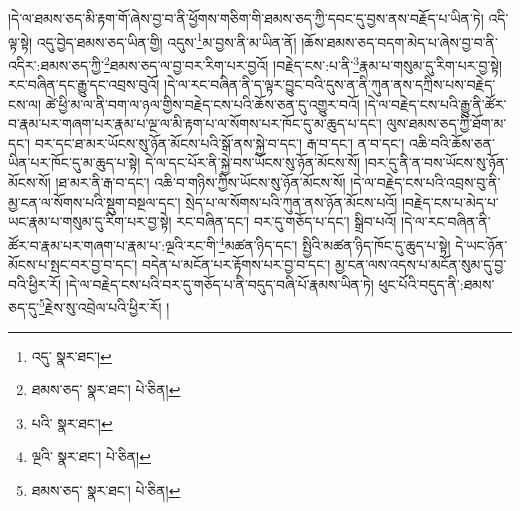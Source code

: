 །དེ་ལ་ཐམས་ཅད་མི་རྟག་གོ་ཞེས་བྱ་བ་ནི་ཕྱོགས་གཅིག་གི་ཐམས་ཅད་ཀྱི་དབང་དུ་བྱས་ནས་བརྗོད་པ་ཡིན་ཏེ། འདི་ལྟ་སྟེ། འདུ་བྱེད་ཐམས་ཅད་ཡིན་གྱི། འདུས་\footnote{འདུ་  སྣར་ཐང་། }མ་བྱས་ནི་མ་ཡིན་ནོ། །ཆོས་ཐམས་ཅད་བདག་མེད་པ་ཞེས་བྱ་བ་ནི་འདིར་:ཐམས་ཅད་ཀྱི་\footnote{ཐམས་ཅད་  སྣར་ཐང་།  པེ་ཅིན། }ཐམས་ཅད་ལ་བྱ་བར་རིག་པར་བྱའོ། །བརྗེད་ངས་:པ་ནི་\footnote{པའི་  སྣར་ཐང་། }རྣམ་པ་གསུམ་དུ་རིག་པར་བྱ་སྟེ། རང་བཞིན་དང་རྒྱུ་དང་འབྲས་བུའོ། །དེ་ལ་རང་བཞིན་ནི་ད་ལྟར་བྱུང་བའི་དུས་ན་ནི་ཀུན་ནས་དཀྲིས་པས་བརྗེད་ངས་ལ། ཚེ་ཕྱི་མ་ལ་ནི་བག་ལ་ཉལ་གྱིས་བརྗེད་ངས་པའི་ཆོས་ཅན་དུ་འགྱུར་བའོ། །དེ་ལ་བརྗེད་ངས་པའི་རྒྱུ་ནི་ཚོར་བ་རྣམ་པར་གཞག་པར་རྣམ་པ་ལྔ་ལ་མི་རྟག་པ་ལ་སོགས་པར་ཁོང་དུ་མ་ཆུད་པ་དང་། ལུས་ཐམས་ཅད་ཀྱི་ཐོག་མ་དང་། བར་དང་ཐ་མར་ཡོངས་སུ་ཉོན་མོངས་པའི་སྒོ་ནས་སྐྱེ་བ་དང་། རྒ་བ་དང་། ན་བ་དང་། འཆི་བའི་ཆོས་ཅན་ཡིན་པར་ཁོང་དུ་མ་ཆུད་པ་སྟེ། དེ་ལ་དང་པོར་ནི་སྐྱེ་བས་ཡོངས་སུ་ཉོན་མོངས་སོ། །བར་དུ་ནི་ན་བས་ཡོངས་སུ་ཉོན་མོངས་སོ། །ཐ་མར་ནི་རྒ་བ་དང་། འཆི་བ་གཉིས་ཀྱིས་ཡོངས་སུ་ཉོན་མོངས་སོ། །དེ་ལ་བརྗེད་ངས་པའི་འབྲས་བུ་ནི་མྱ་ངན་ལ་སོགས་པའི་སྡུག་བསྔལ་དང་། སྲེད་པ་ལ་སོགས་པའི་ཀུན་ནས་ཉོན་མོངས་པའོ། །བརྗེད་ངས་པ་མེད་པ་ཡང་རྣམ་པ་གསུམ་དུ་རིག་པར་བྱ་སྟེ། རང་བཞིན་དང་། བར་དུ་གཅོད་པ་དང་། སྒྲིབ་པའོ། །དེ་ལ་རང་བཞིན་ནི་ཚོར་བ་རྣམ་པར་གཞག་པ་རྣམ་པ་:ལྔའི་རང་གི་\footnote{ལྔའི་  སྣར་ཐང་།  པེ་ཅིན། }མཚན་ཉིད་དང་། སྤྱིའི་མཚན་ཉིད་ཁོང་དུ་ཆུད་པ་སྟེ། དེ་ཡང་ཉོན་མོངས་པ་སྤང་བར་བྱ་བ་དང་། བདེན་པ་མངོན་པར་རྟོགས་པར་བྱ་བ་དང་། མྱ་ངན་ལས་འདས་པ་མངོན་སུམ་དུ་བྱ་བའི་ཕྱིར་རོ། །དེ་ལ་བརྗེད་ངས་པའི་བར་དུ་གཅོད་པ་ནི་བདུད་བཞི་པོ་རྣམས་ཡིན་ཏེ། ཕུང་པོའི་བདུད་ནི་:ཐམས་ཅད་དུ་\footnote{ཐམས་ཅད་  སྣར་ཐང་།  པེ་ཅིན། }རྗེས་སུ་འབྲེལ་པའི་ཕྱིར་རོ། །
